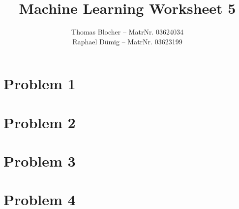 \documentclass{scrartcl}
\title{Machine Learning Worksheet 5}
\author{Thomas Blocher -- MatrNr. 03624034 \\ Raphael D\"umig -- MatrNr. 03623199}
\begin{document}
\maketitle

\section*{Problem 1}


\section*{Problem 2}


\section*{Problem 3}


\section*{Problem 4}

\end{document}
